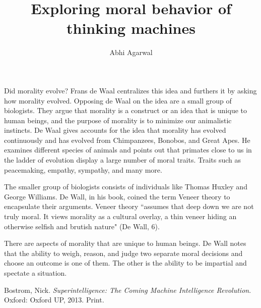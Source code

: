 \documentclass[11pt, oneside]{article}
\title{Exploring moral behavior of thinking machines}
\author{Abhi Agarwal}
\date{}
\begin{document}
\maketitle

\par Did morality evolve? Frans de Waal centralizes this idea and furthers it by asking how morality evolved. Opposing de Waal on the idea are a small group of biologists. They argue that morality is a construct or an idea that is unique to human beings, and the purpose of morality is to minimize our animalistic instincts. De Waal gives accounts for the idea that morality has evolved continuously and has evolved from Chimpanzees, Bonobos, and Great Apes. He examines different species of animals and points out that primates close to us in the ladder of evolution display a large number of moral traits. Traits such as peacemaking, empathy, sympathy, and many more.

\par The smaller group of biologists consists of individuals like Thomas Huxley and George Williams. De Wall, in his book, coined the term Veneer theory to encapsulate their arguments. Veneer theory ``assumes that deep down we are not truly moral. It views morality as a cultural overlay, a thin veneer hiding an otherwise selfish and brutish nature" (De Wall, 6). 

\par There are aspects of morality that are unique to human beings. De Wall notes that the ability to weigh, reason, and judge two separate moral decisions and choose an outcome is one of them. The other is the ability to be impartial and spectate a situation. 

\begin{thebibliography}{9}

  Bostrom, Nick. 
  \emph{Superintelligence: The Coming Machine Intelligence Revolution}.
  Oxford: Oxford UP, 2013. 
  Print.

\end{thebibliography}
\end{document}
